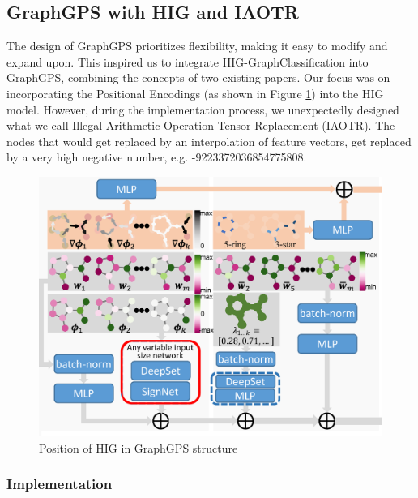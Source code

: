 \subsection{GraphGPS with HIG and IAOTR}
\label{sec:graphgps_hig}
The design of GraphGPS prioritizes flexibility, making it easy to modify and expand upon. This inspired us to integrate HIG-GraphClassification into GraphGPS, combining the concepts of two existing papers. Our focus was on incorporating the Positional Encodings (as shown in Figure \ref{fig:gps-hig-position}) into the HIG model. However, during the implementation process, we unexpectedly designed what we call Illegal Arithmetic Operation Tensor Replacement (IAOTR). The nodes that would get replaced by an interpolation of feature vectors, get replaced by a very high negative number, e.g. -9223372036854775808. 

\begin{figure}[ht]
    \centering
    \includegraphics[scale=0.2]{tex/res/gps_hig_position.png}
    \caption{Position of HIG in GraphGPS structure}
    \label{fig:gps-hig-position}
\end{figure}

\subsubsection{Implementation}


